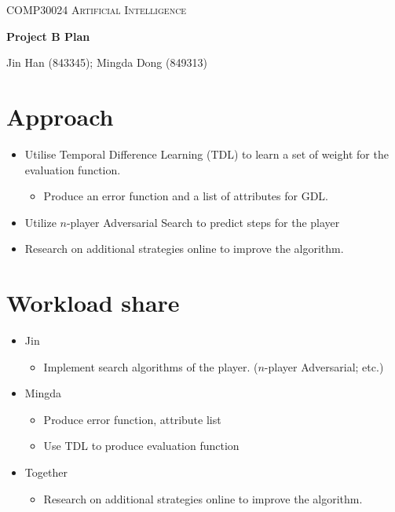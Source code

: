 \documentclass{article}
\begin{document}
\begin{center}
\textsc{COMP30024 Artificial Intelligence}

\vspace{0.5em}
\textbf{\Large Project B Plan}

\vspace{0.5em}
{\small Jin Han (843345); Mingda Dong (849313)}
\end{center}

\section*{Approach}

\begin{itemize}
    \item Utilise Temporal Difference Learning (TDL) to learn a set of weight for
        the evaluation function.
        \begin{itemize}
            \item Produce an error function and a list of attributes for GDL.
        \end{itemize}
    \item Utilize $n$-player Adversarial Search
        to predict steps for the player
    \item Research on additional strategies online to improve the algorithm.
\end{itemize}

\section*{Workload share}

\begin{itemize}
    \item Jin
    \begin{itemize}
        \item Implement search algorithms of the player. ($n$-player Adversarial; etc.)
    \end{itemize}

    \item Mingda
    \begin{itemize}
        \item Produce error function, attribute list
        \item Use TDL to produce evaluation function
    \end{itemize}

    \item Together
    \begin{itemize}
        \item Research on additional strategies online to improve the algorithm.
    \end{itemize}

\end{itemize}
\end{document}
